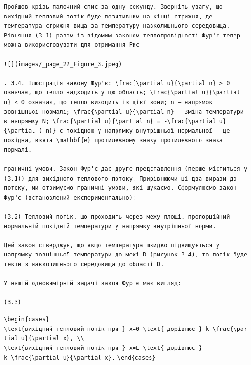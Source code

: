 \documentclass[
  ukrainian,
]{article}
\begin{document}
\begin{verbatim}
Пройшов крізь палочний спис за одну секунду. Зверніть увагу, що вихідний тепловий потік буде позитивним на кінці стрижня, де температура стрижня вища за температуру навколишнього середовища. Рівняння (3.1) разом із відомим законом теплопровідності Фур'є тепер можна використовувати для отримання Рис

![](images/_page_22_Figure_3.jpeg)

. 3.4. Ілюстрація закону Фур'є: \frac{\partial u}{\partial n} > 0 означає, що тепло надходить у цю область; \frac{\partial u}{\partial n} < 0 означає, що тепло виходить із цієї зони; n — напрямок зовнішньої нормалі; \frac{\partial u}{\partial n} - Зміна температури в напрямку N; \frac{\partial u}{\partial n} = -\frac{\partial u}{\partial (-n)} є похідною у напрямку внутрішньої нормальної — це похідна, взята \mathbf{e} протилежному знаку протилежного знака пормалі.

граничні умови. Закон Фур'є дає друге представлення (перше міститься у (3.1)) для вихідного теплового потоку. Прирівнюючи ці два вирази до потоку, ми отримуємо граничні умови, які шукаємо. Сформулюємо закон Фур'є (встановлений експериментально):

(3.2) Тепловий потік, що проходить через межу площі, пропорційний нормальній похідній температури у напрямку внутрішньої норми.

Цей закон стверджує, що якщо температура швидко підвищується у напрямку зовнішньої температури до межі D (рисунок 3.4), то потік буде текти з навколишнього середовища до області D.

У нашій одновимірній задачі закон Фур'є має вигляд:

(3.3)
\end{verbatim}

\texttt{\textbackslash{}begin\{cases\}}
\texttt{\textbackslash{}text\{вихідний\ тепловий\ потік\ при\ \}\ x=0\ \textbackslash{}text\{\ дорівнює\ \}\ k\ \textbackslash{}frac\{\textbackslash{}partial\ u\}\{\textbackslash{}partial\ x\},\ \textbackslash{}\textbackslash{}}
\texttt{\textbackslash{}text\{вихідний\ тепловий\ потік\ при\ \}\ x=L\ \textbackslash{}text\{\ дорівнює\ \}\ -k\ \textbackslash{}frac\{\textbackslash{}partial\ u\}\{\textbackslash{}partial\ x\}.}
\texttt{\textbackslash{}end\{cases\}}
\end{document}
